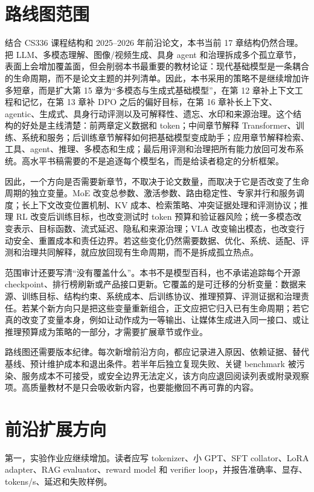 \documentclass[UTF8,zihao=-4,openany]{ctexbook}
\newcommand{\Transformer}{Transformer}
\begin{document}
\section{路线图范围}
结合 CS336 课程结构和 2025--2026 年前沿论文，本书当前 17 章结构仍然合理。把 LLM、多模态理解、图像/视频生成、具身 agent 和治理拆成多个孤立章节，表面上会增加覆盖面，但会削弱本书最重要的教材论证：现代基础模型是一条耦合的生命周期，而不是论文主题的并列清单。因此，本书采用的策略不是继续增加许多短章，而是扩大第 15 章为“多模态与生成式基础模型”，在第 12 章补上下文工程和记忆，在第 13 章补 DPO 之后的偏好目标，在第 16 章补长上下文、agentic、生成式、具身行动评测以及可解释性、遗忘、水印和来源治理。这个结构的好处是主线清楚：前两章定义数据和 token；中间章节解释 \Transformer、训练、系统和服务；后训练章节解释如何把基础模型变成助手；应用章节解释检索、工具、agent、推理、多模态和生成；最后用评测和治理把所有能力放回可发布系统。高水平书稿需要的不是追逐每个模型名，而是给读者稳定的分析框架。

因此，一个方向是否需要新章节，不取决于论文数量，而取决于它是否改变了生命周期的独立变量。MoE 改变总参数、激活参数、路由稳定性、专家并行和服务调度；长上下文改变位置机制、KV 成本、检索策略、冲突证据处理和评测协议；推理 RL 改变后训练目标，也改变测试时 token 预算和验证器风险；统一多模态改变表示、目标函数、流式延迟、隐私和来源治理；VLA 改变输出模态，也改变行动安全、重置成本和责任边界。若这些变化仍然需要数据、优化、系统、适配、评测和治理共同解释，就应放回现有生命周期，而不是拆成孤立热点。

范围审计还要写清“没有覆盖什么”。本书不是模型百科，也不承诺追踪每个开源 checkpoint、排行榜刷新或产品接口更新。它覆盖的是可迁移的分析变量：数据来源、训练目标、结构约束、系统成本、后训练协议、推理预算、评测证据和治理责任。若某个新方向只是把这些变量重新组合，正文应把它归入已有生命周期；若它真的改变了变量本身，例如让动作成为一等输出、让媒体生成进入同一接口、或让推理预算成为策略的一部分，才需要扩展章节或作业。

路线图还需要版本纪律。每次新增前沿方向，都应记录进入原因、依赖证据、替代基线、预计维护成本和退出条件。若半年后独立复现失败、关键 benchmark 被污染、服务成本不可接受，或安全边界无法定义，该方向应退回阅读列表或附录观察项。高质量教材不是只会吸收新内容，也要能撤回不再可靠的内容。

\section{前沿扩展方向}
第一，实验作业应继续增加。读者应写 tokenizer、小 GPT、SFT collator、LoRA adapter、RAG evaluator、reward model 和 verifier loop，并报告准确率、显存、tokens/s、延迟和失败样例。
\end{document}
